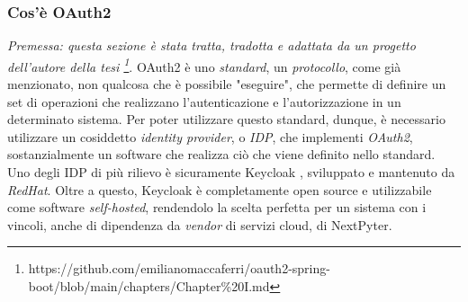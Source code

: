 \subsubsection{Cos'è OAuth2}
\textit{Premessa: questa sezione è stata tratta, tradotta e adattata da un progetto dell'autore della tesi \footnote{https://github.com/emilianomaccaferri/oauth2-spring-boot/blob/main/chapters/Chapter\%20I.md}}.
\newline
\newline
OAuth2 è uno \textit{standard}, un \textit{protocollo}, come già menzionato, non qualcosa che è possibile "eseguire", che permette di definire un set di operazioni che realizzano l'autenticazione e l'autorizzazione in un determinato sistema.\newline
Per poter utilizzare questo standard, dunque, è necessario utilizzare un cosiddetto \textit{identity provider}, o \textit{IDP}, che implementi \textit{OAuth2}, sostanzialmente un software che realizza ciò che viene definito nello standard.
\newline
Uno degli IDP di più rilievo è sicuramente Keycloak \cite{keycloak-stats}, sviluppato e mantenuto da \textit{RedHat}. Oltre a questo, Keycloak è completamente open source e utilizzabile come software \textit{self-hosted}, rendendolo la scelta perfetta per un sistema con i vincoli, anche di dipendenza da \textit{vendor} di servizi cloud, di NextPyter.

